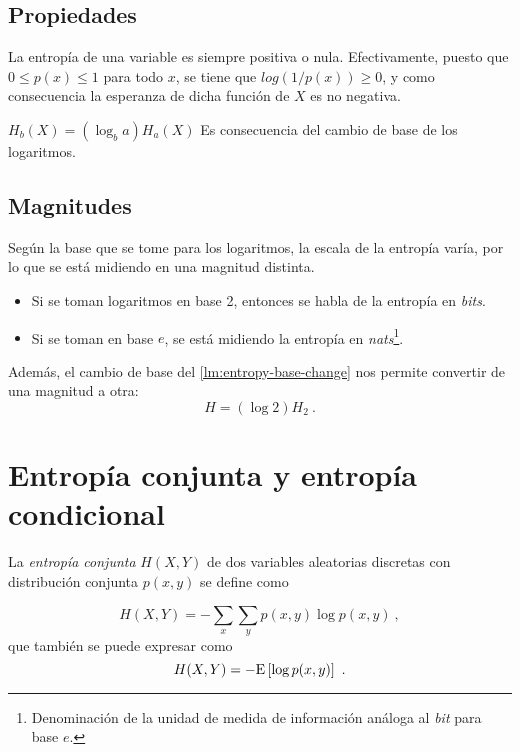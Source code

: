 \subsection{Propiedades}\label{propiedades}

\lemmab
La entropía de una variable es siempre positiva o nula. \proofb
Efectivamente, puesto que \(0\leq p(x)\leq 1\) para todo \(x\), se tiene
que \(log(1/p(x))\geq 0\), y como consecuencia la esperanza de dicha
función de \(X\) es no negativa. \proofe
\lemmae

\lemmab
\(H_b(X)=\left(\log_b a\right)H_a(X)\) \label{lm:entropy-base-change}
\proofb
Es consecuencia del cambio de base de los logaritmos. \proofe
\lemmae

\subsection{Magnitudes}\label{magnitudes}

Según la base que se tome para los logaritmos, la escala de la entropía
varía, por lo que se está midiendo en una magnitud distinta.

\begin{itemize}
\tightlist
\item
  Si se toman logaritmos en base 2, entonces se habla de la entropía en
  \emph{bits}.
\item
  Si se toman en base \(e\), se está midiendo la entropía en
  \emph{nats}\footnote{Denominación de la unidad de medida de información análoga al \emph{bit} para base $e$.}.
\end{itemize}

Además, el cambio de base del
\autoref{lm:entropy-base-change}
nos permite convertir de una magnitud a otra: \[H=(\log 2) H_2~.\]

\section{Entropía conjunta y entropía
condicional}\label{entropuxeda-conjunta-y-entropuxeda-condicional}

La \emph{entropía conjunta} \(H(X,Y)\) de dos variables aleatorias
discretas con distribución conjunta \(p(x,y)\) se define como

\begin{equation}H(X,Y)=-\sum_{x}\sum_{y}p(x,y)\log p(x,y)~,\end{equation}
que también se puede expresar como
\begin{equation}H(X,Y)=-\mathrm{E}\left[\log p(x,y)\right]~.\end{equation}

